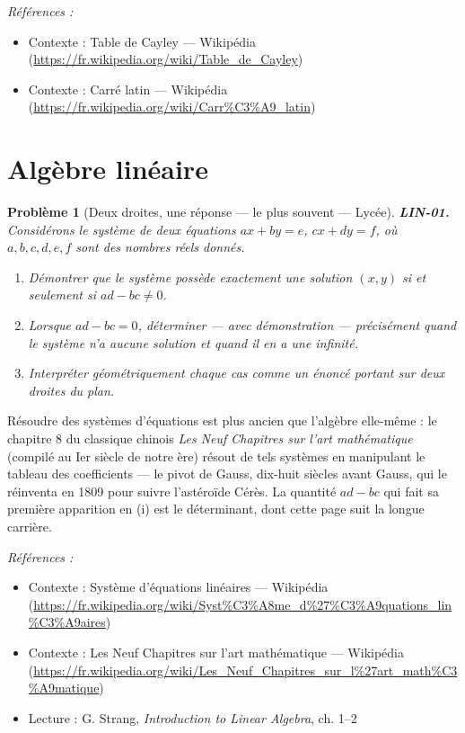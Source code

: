 \documentclass[11pt]{article}
\newtheorem{problem}{Problème}
\newenvironment{refs}{\par\small\noindent\emph{Références :}\begin{itemize}\setlength\itemsep{0pt}}{\end{itemize}\normalsize}
\begin{document}
\begin{refs}
\item Contexte : Table de Cayley --- Wikipédia (\url{https://fr.wikipedia.org/wiki/Table_de_Cayley})
\item Contexte : Carré latin --- Wikipédia (\url{https://fr.wikipedia.org/wiki/Carr%C3%A9_latin})
\end{refs}

\bigskip


\section*{Algèbre linéaire}

\begin{problem}[{Deux droites, une réponse --- le plus souvent --- Lycée}]
\textbf{LIN-01.} Considérons le système de deux équations
$ax + by = e$, $cx + dy = f$, où $a, b, c, d, e, f$ sont des nombres réels donnés.
\begin{enumerate}
\item[(i)] Démontrer que le système possède exactement une solution $(x, y)$ si et seulement si
$ad - bc \ne 0$.
\item[(ii)] Lorsque $ad - bc = 0$, déterminer --- avec démonstration --- précisément quand le système
n'a aucune solution et quand il en a une infinité.
\item[(iii)] Interpréter géométriquement chaque cas comme un
énoncé portant sur deux droites du plan.
\end{enumerate}

\end{problem}

\noindent Résoudre des systèmes d'équations est plus ancien que l'algèbre elle-même : le
chapitre 8 du classique chinois \textit{Les Neuf Chapitres sur l'art mathématique} (compilé au
Ier siècle de notre ère) résout de tels systèmes en manipulant le tableau des
coefficients --- le pivot de Gauss, dix-huit siècles avant Gauss, qui le réinventa en 1809 pour
suivre l'astéroïde Cérès. La quantité $ad - bc$ qui fait sa première apparition en (i) est le
déterminant, dont cette page suit la longue carrière.

\begin{refs}
\item Contexte : Système d'équations linéaires --- Wikipédia (\url{https://fr.wikipedia.org/wiki/Syst%C3%A8me_d%27%C3%A9quations_lin%C3%A9aires})
\item Contexte : Les Neuf Chapitres sur l'art mathématique --- Wikipédia (\url{https://fr.wikipedia.org/wiki/Les_Neuf_Chapitres_sur_l%27art_math%C3%A9matique})
\item Lecture : G. Strang, \textit{Introduction to Linear Algebra}, ch. 1--2
\end{refs}
\end{document}
